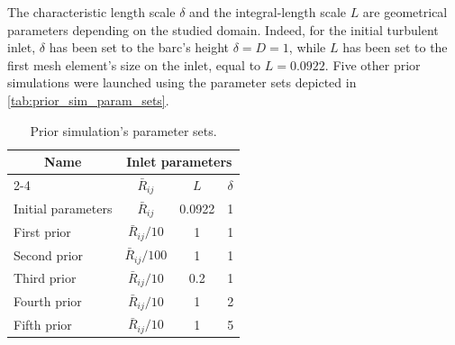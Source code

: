 \documentclass[12pt,twoside]{report}
\begin{document}
The characteristic length scale $\delta$ and the integral-length scale $L$ are geometrical parameters depending on the studied domain. Indeed, for the initial turbulent inlet, $\delta$ has been set to the \gls{barc}'s height $\delta=D=1$, while $L$ has been set to the first mesh element's size on the inlet, equal to $L=0.0922$. Five other prior simulations were launched using the parameter sets depicted in \autoref{tab:prior_sim_param_sets}. 

\begin{table}[h!]
\centering
\begin{tabular}{lccc} \toprule[1.5pt]
\multicolumn{1}{c}{\textbf{Name}} & \multicolumn{3}{c}{\textbf{Inlet parameters}} \\ \cmidrule{2-4}
                         & $\bar{R}_{ij}$   & $L$   & $\delta$   \\ \midrule
Initial parameters                    & $\bar{R}_{ij}$        & 0.0922        & 1        \\
First prior                    & $\bar{R}_{ij}/10$        & 1        & 1        \\
Second prior                    & $\bar{R}_{ij}/100$        & 1        & 1		\\ 
Third prior                    & $\bar{R}_{ij}/10$        & 0.2        & 1		\\ 
Fourth prior                & $\bar{R}_{ij}/10$        & 1        & 2		\\ 
Fifth prior                    & $\bar{R}_{ij}/10$        & 1        & 5		\\ 
\bottomrule[1.5pt]
\end{tabular}
\caption{Prior simulation's parameter sets.}
\label{tab:prior_sim_param_sets}
\end{table}
\end{document}
